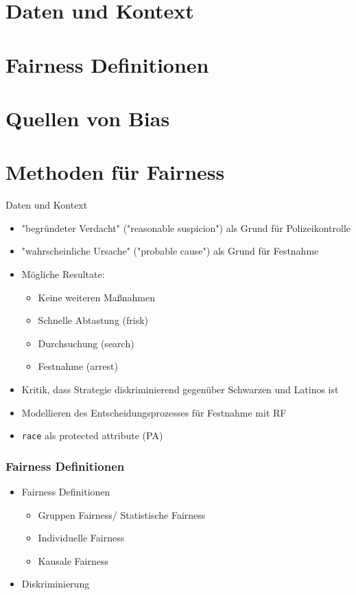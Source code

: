 \documentclass[aspectratio=169]{beamer}
\begin{document}
\section{Daten und Kontext}
\section{Fairness Definitionen}
\section{Quellen von Bias}
\section{Methoden für Fairness}

\begin{frame}{Daten und Kontext}
	\begin{itemize}
		\item "begründeter Verdacht" ("reasonable suspicion") als Grund für Polizeikontrolle
		\item "wahrscheinliche Ursache" ("probable cause") als Grund für Festnahme
		\item Mögliche Resultate:
		\begin{itemize}
			\item Keine weiteren Maßnahmen
			\item Schnelle Abtastung (frisk)
			\item Durchsuchung (search)
			\item Festnahme (arrest)
		\end{itemize}
		\item Kritik, dass Strategie diskriminierend gegenüber Schwarzen und Latinos ist
		\item Modellieren des Entscheidungsprozesses für Festnahme mit RF
		\item \texttt{race} als protected attribute (PA)
	\end{itemize}
\end{frame}
	
\begin{frame}
	\frametitle{Fairness Definitionen}
	\begin{itemize}
		\item Fairness Definitionen
		\begin{itemize}
			\item Gruppen Fairness/ Statistische Fairness
			\item Individuelle Fairness
			\item Kausale Fairness
		\end{itemize}
		\item Diskriminierung
	\end{itemize}
\end{frame}
\end{document}
